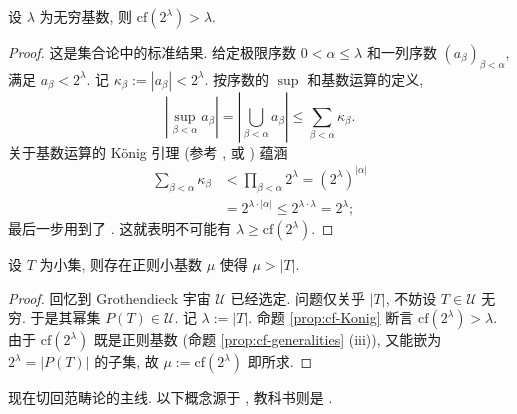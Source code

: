 \begin{proposition}[见 {\cite[Theorem 5.10]{Je03}}]\label{prop:cf-Konig}
	设 $\lambda$ 为无穷基数, 则 $\mathrm{cf}(2^\lambda) > \lambda$.
\end{proposition}
\begin{proof}
	这是集合论中的标准结果. 给定极限序数 $0 < \alpha \leq \lambda$ 和一列序数 $(a_\beta)_{\beta < \alpha}$, 满足 $a_\beta < 2^\lambda$. 记 $\kappa_\beta := |a_\beta| < 2^\lambda$. 按序数的 $\sup$ 和基数运算的定义,
	\[ \left| \sup_{\beta < \alpha} a_\beta \right| = \left| \bigcup_{\beta < \alpha} a_\beta \right| \leq \sum_{\beta < \alpha} \kappa_\beta. \]
	关于基数运算的 König 引理 (参考 \cite[习题 1.6]{Li1}, 或 \cite[Theorem 5.10]{Je03}) 蕴涵
	\begin{align*}
		\sum_{\beta < \alpha} \kappa_\beta & < \prod_{\beta < \alpha} 2^\lambda = (2^\lambda)^{|\alpha|} \\
		& = 2^{\lambda \cdot |\alpha|} \leq 2^{\lambda \cdot \lambda} = 2^\lambda ;
	\end{align*}
	最后一步用到了 \cite[定理 1.4.8]{Li1}. 这就表明不可能有 $\lambda \geq \mathrm{cf}(2^\lambda)$.
\end{proof}

\begin{lemma}\label{prop:enough-regular-cardinal}
	设 $T$ 为小集, 则存在正则小基数 $\mu$ 使得 $\mu > |T|$.
\end{lemma}
\begin{proof}
	回忆到 Grothendieck 宇宙 $\mathcal{U}$ 已经选定. 问题仅关乎 $|T|$, 不妨设 $T \in \mathcal{U}$ 无穷. 于是其幂集 $P(T) \in \mathcal{U}$. 记 $\lambda := |T|$. 命题 \ref{prop:cf-Konig} 断言 $\mathrm{cf}(2^\lambda) > \lambda$. 由于 $\mathrm{cf}(2^\lambda)$ 既是正则基数 (命题 \ref{prop:cf-generalities} (iii)), 又能嵌为 $2^\lambda = |P(T)|$ 的子集, 故 $\mu := \mathrm{cf}(2^\lambda)$ 即所求.
\end{proof}

现在切回范畴论的主线. 以下概念源于 \cite{GU71}, 教科书则是 \cite[Chapters 1, 2]{AR94}.

